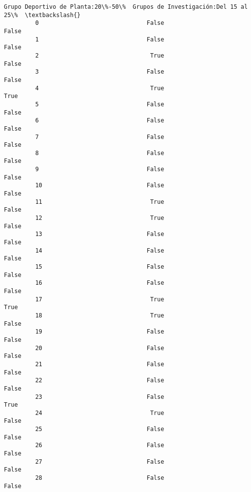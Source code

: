 \documentclass[11pt]{article}
\begin{document}
\begin{Verbatim}[commandchars=\\\{\}]
             Grupo Deportivo de Planta:20\%-50\%  Grupos de Investigación:Del 15 al 25\%  \textbackslash{}
         0                               False                                  False   
         1                               False                                  False   
         2                                True                                  False   
         3                               False                                  False   
         4                                True                                   True   
         5                               False                                  False   
         6                               False                                  False   
         7                               False                                  False   
         8                               False                                  False   
         9                               False                                  False   
         10                              False                                  False   
         11                               True                                  False   
         12                               True                                  False   
         13                              False                                  False   
         14                              False                                  False   
         15                              False                                  False   
         16                              False                                  False   
         17                               True                                   True   
         18                               True                                  False   
         19                              False                                  False   
         20                              False                                  False   
         21                              False                                  False   
         22                              False                                  False   
         23                              False                                   True   
         24                               True                                  False   
         25                              False                                  False   
         26                              False                                  False   
         27                              False                                  False   
         28                              False                                  False   

\end{Verbatim}
\end{document}
